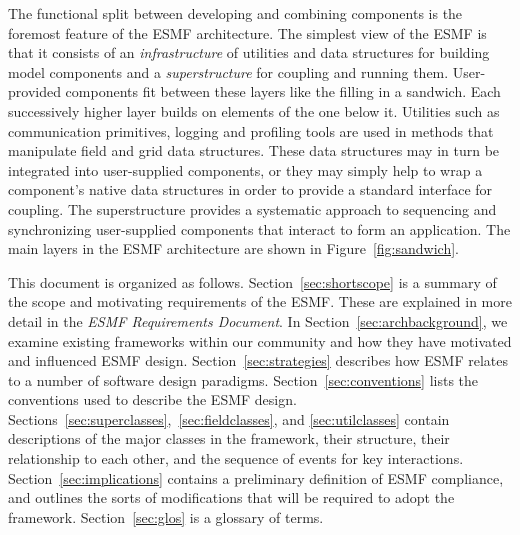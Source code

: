 The functional split between developing and combining components is the
foremost feature of the ESMF architecture.  The simplest view of the ESMF 
is that it consists of an {\it infrastructure} of utilities and data 
structures for building model components and a {\it superstructure} for coupling 
and running them.  User-provided components fit between these 
layers like the filling in a sandwich.  Each successively higher layer builds
on elements of the one below it.  Utilities such as communication
primitives, logging and profiling tools are used in methods that
manipulate field and grid data structures.  These data structures may in 
turn be integrated into user-supplied components, or they may simply 
help to wrap a component's native data structures in order to provide 
a standard interface for coupling.  The superstructure provides a systematic 
approach to sequencing and synchronizing user-supplied components that 
interact to form an application.  The main layers in the ESMF architecture are 
shown in Figure~\ref{fig:sandwich}.  

This document is organized as follows.  Section~\ref{sec:shortscope} is a summary of the 
scope and motivating requirements of the ESMF.  These are explained in more detail in 
the {\it ESMF Requirements Document}.  In Section~\ref{sec:archbackground}, 
we examine existing frameworks within our community and how they have motivated
and influenced ESMF design.  Section~\ref{sec:strategies} describes how ESMF relates 
to a number of software design paradigms.  Section~\ref{sec:conventions} lists the
conventions used to describe the ESMF design.
Sections~\ref{sec:superclasses},~\ref{sec:fieldclasses}, and
\ref{sec:utilclasses} contain descriptions of the 
major classes in the framework, their structure, their relationship to each other, 
and the sequence of events for key interactions.  Section~\ref{sec:implications} 
contains a preliminary definition of ESMF compliance, and outlines the sorts
of modifications that will be required to adopt the framework.  Section~\ref{sec:glos} is a 
glossary of terms.








